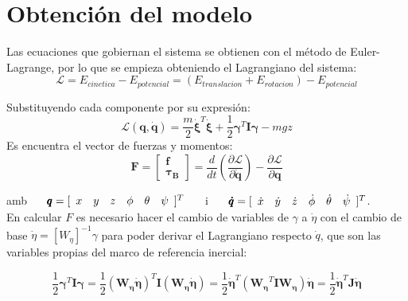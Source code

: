 \documentclass[twoside,11pt]{book}
\begin{document}
\section{Obtención del modelo}
Las ecuaciones que gobiernan el sistema se obtienen con el método de Euler-Lagrange, por lo que se empieza obteniendo el Lagrangiano del sistema:
\begin{equation}
\mathcal{L}=E_{cinetica} - E_{potencial} = (E_{translacion}+E_{rotacion})-E_{potencial}
\end{equation}

Substituyendo cada componente por su expresión:
\begin{equation}
\mathcal{L}(\pmb{q},\pmb{\dot{q}})=\frac{m}{2} \pmb{\dot{\xi}}^T \pmb{\dot{\xi}} + \frac{1}{2}\pmb{\gamma}^{T}\pmb{I}\pmb{\gamma} - mgz
\end{equation}
Es encuentra el vector de fuerzas y  momentos:
\begin{equation}
\pmb{F}=\left[ \begin{array}{c}
\pmb{f} \\
\pmb{\tau_B}
\end{array} \right] = \frac{d}{dt}\left(\frac{\partial \mathcal{L}}{\partial \pmb{\dot{q}}}\right)-\frac{\partial\mathcal{L}}{\partial \pmb{q}}
\end{equation}

amb $ \hspace{0.5cm} \pmb{q}=[\begin{array}{cccccc}
x & y & z & \phi & \theta & \psi
\end{array} ]^{T} \hspace{0.5cm}$ i $ \hspace{0.5cm} \pmb{\dot{q}}=[\begin{array}{cccccc}
\dot{x} & \dot{y} & \dot{z} & \dot{\phi} & \dot{\theta} & \dot{\psi}
\end{array} ]^{T}$.\\

En calcular $F$ es necesario hacer el cambio de variables de $\gamma$ a $\dot{\eta}$ con el cambio de base $\dot{\eta}=\left[ W_\eta \right]^{-1} \gamma$ para poder derivar el Lagrangiano respecto $\dot{q}$, que son las variables propias del marco de referencia inercial:

\begin{equation}
\frac{1}{2}\pmb{\gamma}^{T}\pmb{I}\pmb{\gamma} = \frac{1}{2}(\pmb{W_\eta} \pmb{\dot{\eta}})^{T}\pmb{I}(\pmb{W_\eta} \pmb{\dot{\eta}}) = \frac{1}{2}\pmb{\dot{\eta}}^{T}(\pmb{W_\eta} ^{T}\pmb{I}\pmb{W_\eta})\pmb{\dot{\eta}} = \frac{1}{2}\pmb{\dot{\eta}}^{T}\pmb{J}\pmb{\dot{\eta}}
\end{equation}
\end{document}
